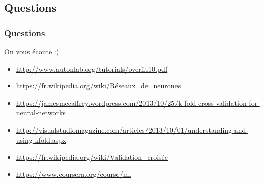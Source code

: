 \documentclass[handout]{beamer}
\begin{document}
	\subsection{Questions}
		\begin{frame}
		\frametitle{Questions}
		On vous écoute :)
		\vspace{40px}
		\tiny{
			\begin{itemize}
				\item \url{http://www.autonlab.org/tutorials/overfit10.pdf}
				\item \url{https://fr.wikipedia.org/wiki/Réseaux\_de\_neurones}
				\item \url{https://jamesmccaffrey.wordpress.com/2013/10/25/k-fold-cross-validation-for-neural-networks}
				\item \url{http://visualstudiomagazine.com/articles/2013/10/01/understanding-and-using-kfold.aspx}
				\item \url{https://fr.wikipedia.org/wiki/Validation\_croisée}
				\item \url{https://www.coursera.org/course/ml}
			\end{itemize}
		}
		\end{frame}


\end{document}
